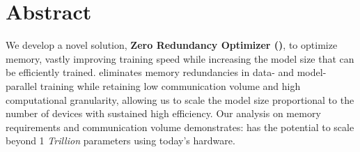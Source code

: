 \section*{Abstract}
We develop a novel solution, \textbf{Zero Redundancy Optimizer (\name)}, to optimize memory, vastly improving training speed while increasing the model size that can be efficiently trained.
\name eliminates memory redundancies in data- and model-parallel training while retaining low communication volume and high computational granularity, allowing us to scale the model size proportional to the number of devices with sustained high efficiency. Our analysis on memory requirements and communication volume demonstrates: \name has the potential to scale beyond 1 \emph{Trillion} parameters using today's hardware.
